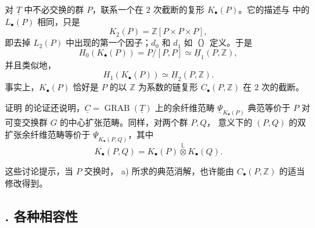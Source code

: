 对 $\underline T$ 中不必交换的群 $P$，联系一个在 $2$ 次截断的复形 $K_\bullet(P)$。它的描述与  中的 $L_\bullet(P)$ 相同，只是
\[
 K_2(P)=\mathbb Z[P\times P\times P],
\]
即去掉 $L_2(P)$ 中出现的第一个因子；$d_0$ 和 $d_1$ 如（）定义。于是
\[
 H_0(K_\bullet(P))=P/[P,P]
 \simeq\underline H_1(P,\mathbb Z),
\]
并且类似地，
\[
 H_1(K_\bullet(P))\simeq\underline H_2(P,\mathbb Z).
\]
事实上，$K_\bullet(P)$ 恰好是 $P$ 的以 $\mathbb Z$ 为系数的链复形 $C_\bullet(P,\mathbb Z)$ 在 $2$ 次的截断。

证明  的论证还说明，$\underline C=\operatorname{GRAB}(\underline T)$ 上的余纤维范畴 $\underline\Psi_{K_\bullet(P)}$ 典范等价于 $P$ 对可变交换群 $G$ 的中心扩张范畴。同样，对两个群 $P,Q$， 意义下的 $(P,Q)$ 的双扩张余纤维范畴等价于 $\underline\Psi_{K_\bullet(P,Q)}$，其中
\[
 K_\bullet(P,Q)
 =
 K_\bullet(P)\mathbin{\overset{\mathbb L}{\otimes}}K_\bullet(Q).
\]


这些讨论提示，当 $P$ 交换时， a) 所求的典范消解，也许能由 $C_\bullet(P,\mathbb Z)$ 的适当修改得到。



\subsection*{. 各种相容性}

